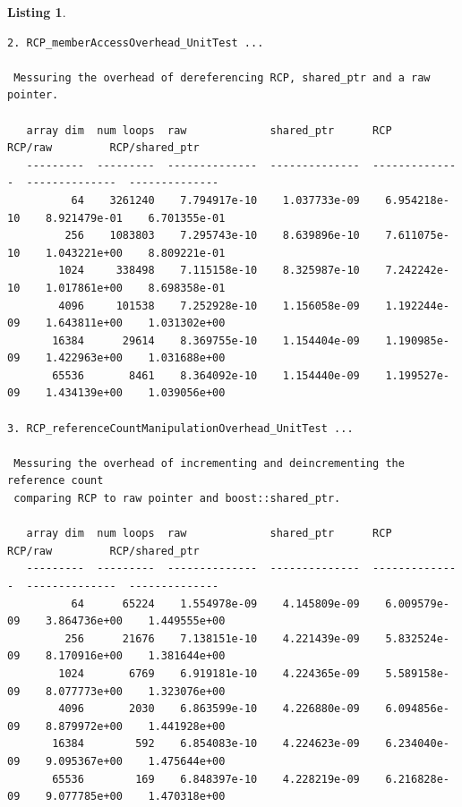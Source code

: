 \documentclass[pdf,ps2pdf,11pt]{SANDreport}
\newtheorem{listing}{Listing}
\begin{document}
\begin{listing}
{\begin{verbatim}
2. RCP_memberAccessOverhead_UnitTest ... 
 
 Messuring the overhead of dereferencing RCP, shared_ptr and a raw pointer.
 
   array dim  num loops  raw             shared_ptr      RCP             RCP/raw         RCP/shared_ptr
   ---------  ---------  --------------  --------------  --------------  --------------  --------------
          64    3261240    7.794917e-10    1.037733e-09    6.954218e-10    8.921479e-01    6.701355e-01
         256    1083803    7.295743e-10    8.639896e-10    7.611075e-10    1.043221e+00    8.809221e-01
        1024     338498    7.115158e-10    8.325987e-10    7.242242e-10    1.017861e+00    8.698358e-01
        4096     101538    7.252928e-10    1.156058e-09    1.192244e-09    1.643811e+00    1.031302e+00
       16384      29614    8.369755e-10    1.154404e-09    1.190985e-09    1.422963e+00    1.031688e+00
       65536       8461    8.364092e-10    1.154440e-09    1.199527e-09    1.434139e+00    1.039056e+00

3. RCP_referenceCountManipulationOverhead_UnitTest ... 
 
 Messuring the overhead of incrementing and deincrementing the reference count
 comparing RCP to raw pointer and boost::shared_ptr.
 
   array dim  num loops  raw             shared_ptr      RCP             RCP/raw         RCP/shared_ptr
   ---------  ---------  --------------  --------------  --------------  --------------  --------------
          64      65224    1.554978e-09    4.145809e-09    6.009579e-09    3.864736e+00    1.449555e+00
         256      21676    7.138151e-10    4.221439e-09    5.832524e-09    8.170916e+00    1.381644e+00
        1024       6769    6.919181e-10    4.224365e-09    5.589158e-09    8.077773e+00    1.323076e+00
        4096       2030    6.863599e-10    4.226880e-09    6.094856e-09    8.879972e+00    1.441928e+00
       16384        592    6.854083e-10    4.224623e-09    6.234040e-09    9.095367e+00    1.475644e+00
       65536        169    6.848397e-10    4.228219e-09    6.216828e-09    9.077785e+00    1.470318e+00
\end{verbatim}}
\end{listing}

\pagebreak
\end{document}
